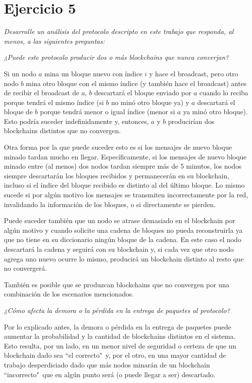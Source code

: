 \section{Ejercicio 5}

\emph{Desarrolle un análisis del protocolo descripto en este trabajo que responda, al menos, a las siguientes preguntas:}

\emph{¿Puede este protocolo producir dos o más blockchains que nunca converjan?}

Si un nodo $a$ mina un bloque nuevo con índice $i$ y hace el broadcast, pero otro nodo $b$ mina otro bloque con el mismo índice (y también hace el broadcast) antes de recibir el broadcast de $a$, $b$ descartará el bloque enviado por $a$ cuando lo reciba porque tendrá el mismo índice (si $b$ no minó otro bloque ya) y $a$ descartará el bloque de $b$ porque tendrá menor o igual índice (menor si $a$ ya minó otro bloque). Esto podría suceder indefinidamente y, entonces, $a$ y $b$ producirían dos blockchains distintos que no convergen.

Otra forma por la que puede suceder esto es si los mensajes de nuevo bloque minado tardan mucho en llegar. Específicamente, si los mensajes de nuevo bloque minado entre (al menos) dos nodos tardan siempre más de 5 minutos, los nodos siempre descartarán los bloques recibidos y permanecerán en su blockchain, incluso si el índice del bloque recibido es distinto al del último bloque. Lo mismo sucede si por algún motivo los mensajes se transmiten incorrectamente por la red, invalidando la información de los bloques, o si directamente se pierden.

Puede suceder también que un nodo se atrase demasiado en el blockchain por algún motivo y cuando solicite una cadena de bloques no pueda reconstruirla ya que no tiene en su diccionario ningún bloque de la cadena. En este caso el nodo descartará la cadena y seguirá con su blockchain y, si cada vez que otro nodo agrega uno nuevo ocurre lo mismo, producirá un blockchain distinto al resto que no convergerá.

También es posible que se produzcan blockchains que no convergen por una combinación de los escenarios mencionados.

\emph{¿Cómo afecta la demora o la pérdida en la entrega de paquetes al protocolo?}

Por lo explicado antes, la demora o pérdida en la entrega de paquetes puede aumentar la probabilidad y la cantidad de blockchains distintos en el sistema. Esto resulta, por un lado, en un menor nivel de seguridad o certeza de que un blockchain dado sea ``el correcto"\ y, por el otro, en una mayor cantidad de trabajo desperdiciado dado que más nodos minarán de un blockchain ``incorrecto"\ que en algún punto será (o puede llegar a ser) descartado.

